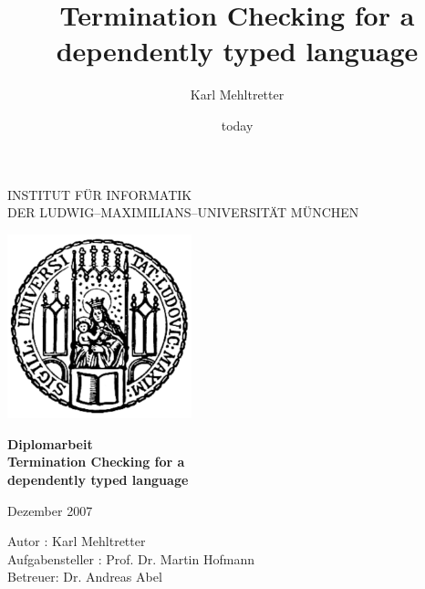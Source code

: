 \documentclass[a4paper,11pt]{report}
\theoremstyle{remark}
\begin{document}
\begin{titlepage}
\begin{center}


\vspace*{-2cm}

{\Huge INSTITUT F\"UR INFORMATIK\\[1mm]} %
DER LUDWIG--MAXIMILIANS--UNIVERSIT\"AT M\"UNCHEN\\

\vspace*{1cm}

\includegraphics[width=0.4\textwidth]{siegel.pdf}

\vspace*{2cm}

{\Large \textbf{Diplomarbeit}}\\

\vspace{2.0cm}
{\Huge \textbf{Termination Checking for a}}\\
\vspace*{3mm}
{\Huge \textbf{dependently typed language}}\\

\vspace{2cm}

\large{Dezember 2007}

\vspace{1.5cm}

  \begin{Large}
      Autor : Karl Mehltretter\\
      Aufgabensteller : Prof. Dr. Martin Hofmann\\
      Betreuer: Dr. Andreas Abel
  \end{Large}

\end{center}
\end{titlepage} 



\title{Termination Checking for a dependently typed language}
\author{Karl Mehltretter}
\date{today}
\end{document}
